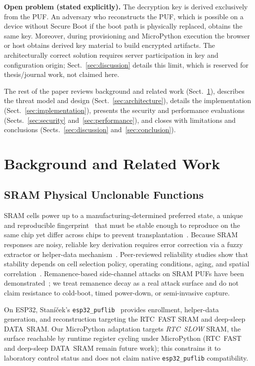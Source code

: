 \documentclass[runningheads]{llncs}
\begin{document}
\noindent\textbf{Open problem (stated explicitly).}
The decryption key is derived exclusively from the PUF. An adversary who reconstructs the PUF, which is possible on a device without Secure Boot if the boot path is physically replaced, obtains the same key. Moreover, during provisioning and MicroPython execution the browser or host obtains derived key material to build encrypted artifacts. The architecturally correct solution requires server participation in key and configuration origin; Sect.~\ref{sec:discussion} details this limit, which is reserved for thesis/journal work, not claimed here.

\medskip
The rest of the paper reviews background and related work (Sect.~\ref{sec:background}), describes the threat model and design (Sect.~\ref{sec:architecture}), details the implementation (Sect.~\ref{sec:implementation}), presents the security and performance evaluations (Sects.~\ref{sec:security} and~\ref{sec:performance}), and closes with limitations and conclusions (Sects.~\ref{sec:discussion} and~\ref{sec:conclusion}).


\section{Background and Related Work}
\label{sec:background}


\subsection{SRAM Physical Unclonable Functions}

SRAM cells power up to a manufacturing-determined preferred state, a unique and reproducible fingerprint~\cite{holcomb2009powerup} that must be stable enough to reproduce on the same chip yet differ across chips to prevent transplantation~\cite{gao2020puf}. Because SRAM responses are noisy, reliable key derivation requires error correction via a fuzzy extractor or helper-data mechanism~\cite{dodis2008fuzzy}. Peer-reviewed reliability studies show that stability depends on cell selection policy, operating conditions, aging, and spatial correlation~\cite{baturone2015improved,saraza2021improving,wilde2018spatial}. Remanence-based side-channel attacks on SRAM PUFs have been demonstrated~\cite{zeitouni2016remanence}; we treat remanence decay as a real attack surface and do not claim resistance to cold-boot, timed power-down, or semi-invasive capture.

On ESP32, Stan\'{i}\v{c}ek's \texttt{esp32\_puflib}~\cite{stanicek2022esp32puflib} provides enrollment, helper-data generation, and reconstruction targeting the RTC~FAST SRAM and deep-sleep DATA~SRAM. Our MicroPython adaptation targets \emph{RTC~SLOW} SRAM, the surface reachable by runtime register cycling under MicroPython (RTC~FAST and deep-sleep DATA~SRAM remain future work); this constrains it to laboratory control status and does not claim native \texttt{esp32\_puflib} compatibility.
\end{document}
